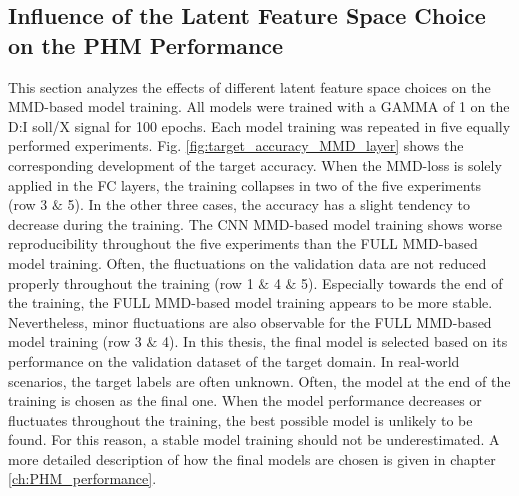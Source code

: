 \subsection{Influence of the Latent Feature Space Choice on the PHM Performance}\label{ch:Influence_Layer_real_dataset}
This section analyzes the effects of different latent feature space choices on the MMD-based model training. All models were trained with a GAMMA of 1 on the D:I soll/X signal for 100 epochs. Each model training was repeated in five equally performed experiments. Fig. \ref{fig:target_accuracy_MMD_layer} shows the corresponding development of the target accuracy. When the MMD-loss is solely applied in the FC layers, the training collapses in two of the five experiments (row 3 $\&$ 5). In the other three cases, the accuracy has a slight tendency to decrease during the training. The CNN MMD-based model training shows worse reproducibility throughout the five experiments than the FULL MMD-based model training. Often, the fluctuations on the validation data are not reduced properly throughout the training (row 1 $\&$ 4 $\&$ 5). Especially towards the end of the training, the FULL MMD-based model training appears to be more stable. Nevertheless, minor fluctuations are also observable for the FULL MMD-based model training (row 3 $\&$ 4). In this thesis, the final model is selected based on its performance on the validation dataset of the target domain. In real-world scenarios, the target labels are often unknown. Often, the model at the end of the training is chosen as the final one. When the model performance decreases or fluctuates throughout the training, the best possible model is unlikely to be found. For this reason, a stable model training should not be underestimated. A more detailed description of how the final models are chosen is given in chapter \ref{ch:PHM_performance}. 

